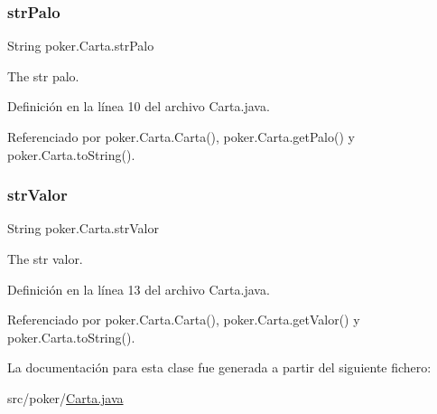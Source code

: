 \subsubsection{\texorpdfstring{strPalo}{strPalo}}
{\footnotesize\ttfamily String poker.\+Carta.\+str\+Palo\hspace{0.3cm}{\ttfamily [private]}}



The str palo. 



Definición en la línea 10 del archivo Carta.\+java.



Referenciado por poker.\+Carta.\+Carta(), poker.\+Carta.\+get\+Palo() y poker.\+Carta.\+to\+String().

\mbox{\label{classpoker_1_1Carta_ad6f9ce08abdee20380c2fcd176fedc58}} 
\subsubsection{\texorpdfstring{strValor}{strValor}}
{\footnotesize\ttfamily String poker.\+Carta.\+str\+Valor\hspace{0.3cm}{\ttfamily [private]}}



The str valor. 



Definición en la línea 13 del archivo Carta.\+java.



Referenciado por poker.\+Carta.\+Carta(), poker.\+Carta.\+get\+Valor() y poker.\+Carta.\+to\+String().



La documentación para esta clase fue generada a partir del siguiente fichero\+:\begin{DoxyCompactItemize}
\item 
src/poker/\mbox{\hyperlink{Carta_8java}{Carta.\+java}}\end{DoxyCompactItemize}
